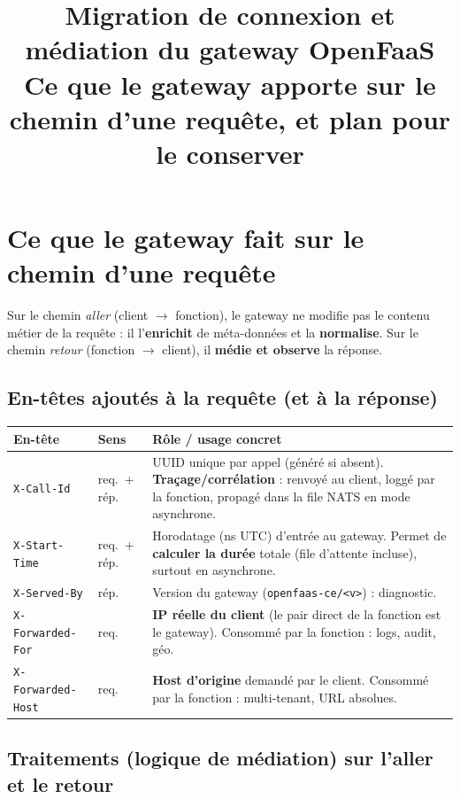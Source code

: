 \documentclass[10pt,a4paper]{article}
\title{\vspace{-1.2cm}\textbf{Migration de connexion et médiation du gateway OpenFaaS}\\
\large Ce que le gateway apporte sur le chemin d'une requête, et plan pour le conserver}
\author{}
\date{}
\newcommand{\code}[1]{\texttt{\small #1}}
\begin{document}
\maketitle
\vspace{-1.4cm}

\section{Ce que le gateway fait sur le chemin d'une requête}

Sur le chemin \emph{aller} (client $\rightarrow$ fonction), le gateway ne modifie pas le contenu
métier de la requête : il l'\textbf{enrichit} de méta-données et la \textbf{normalise}. Sur le chemin
\emph{retour} (fonction $\rightarrow$ client), il \textbf{médie et observe} la réponse.

\subsection{En-têtes ajoutés à la requête (et à la réponse)}

\begin{center}\small
\begin{tabular}{@{}p{3.0cm}p{2.1cm}p{10.6cm}@{}}
\toprule
\textbf{En-tête} & \textbf{Sens} & \textbf{Rôle / usage concret} \\
\midrule
\code{X-Call-Id} & req.\ + rép. & UUID unique par appel (généré si absent). \textbf{Traçage/corrélation} : renvoyé au client, loggé par la fonction, propagé dans la file NATS en mode asynchrone. \\
\code{X-Start-Time} & req.\ + rép. & Horodatage (ns UTC) d'entrée au gateway. Permet de \textbf{calculer la durée} totale (file d'attente incluse), surtout en asynchrone. \\
\code{X-Served-By} & rép. & Version du gateway (\code{openfaas-ce/<v>}) : diagnostic. \\
\code{X-Forwarded-For} & req. & \textbf{IP réelle du client} (le pair direct de la fonction est le gateway). Consommé par la fonction : logs, audit, géo. \\
\code{X-Forwarded-Host} & req. & \textbf{Host d'origine} demandé par le client. Consommé par la fonction : multi-tenant, URL absolues. \\
\bottomrule
\end{tabular}
\end{center}

\subsection{Traitements (logique de médiation) sur l'aller et le retour}
\end{document}
